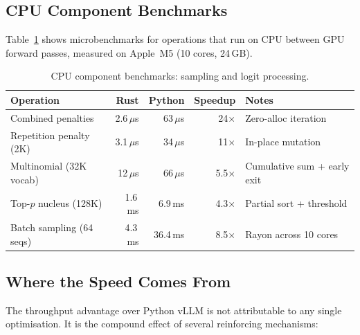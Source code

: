 \documentclass[11pt,a4paper]{article}
\newcommand{\thead}[1]{\textbf{\color{white}#1}}
\begin{document}
\subsection{CPU Component Benchmarks}

Table~\ref{tab:cpu_bench} shows microbenchmarks for operations that run on CPU
between GPU forward passes, measured on Apple~M5 (10 cores, 24\,GB).

\begin{table}[t]
  \centering
  \caption{CPU component benchmarks: sampling and logit processing.}
  \label{tab:cpu_bench}
  \small
  \begin{tabular}{@{}lrrrp{3.2cm}@{}}
    \toprule
    \rowcolor{HeaderBlue} \thead{Operation} & \thead{Rust} & \thead{Python} & \thead{Speedup} & \thead{Notes} \\
    \midrule
    Combined penalties      & 2.6\,$\mu$s  & 63\,$\mu$s  & 24$\times$  & Zero-alloc iteration \\
    \rowcolor{gray!8}
    Repetition penalty (2K) & 3.1\,$\mu$s  & 34\,$\mu$s  & 11$\times$  & In-place mutation \\
    Multinomial (32K vocab)  & 12\,$\mu$s   & 66\,$\mu$s  & 5.5$\times$ & Cumulative sum + early exit \\
    \rowcolor{gray!8}
    Top-$p$ nucleus (128K)  & 1.6\,ms      & 6.9\,ms     & 4.3$\times$ & Partial sort + threshold \\
    Batch sampling (64 seqs) & 4.3\,ms     & 36.4\,ms    & 8.5$\times$ & Rayon across 10 cores \\
    \bottomrule
  \end{tabular}
\end{table}

\subsection{Where the Speed Comes From}

The throughput advantage over Python vLLM is not attributable to any
single optimisation. It is the compound effect of several reinforcing mechanisms:
\end{document}
